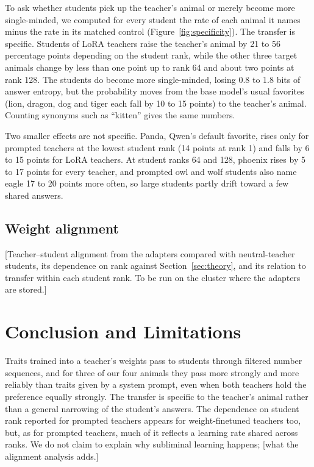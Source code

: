 \documentclass[11pt]{article}
\newcommand{\todo}[1]{\textcolor{red!70!black}{[#1]}}
\begin{document}
To ask whether students pick up the teacher's animal or merely become more single-minded, we computed for every student the rate of each animal it names minus the rate in its matched control (Figure~\ref{fig:specificity}). The transfer is specific. Students of LoRA teachers raise the teacher's animal by 21 to 56 percentage points depending on the student rank, while the other three target animals change by less than one point up to rank 64 and about two points at rank 128. The students do become more single-minded, losing 0.8 to 1.8 bits of answer entropy, but the probability moves from the base model's usual favorites (lion, dragon, dog and tiger each fall by 10 to 15 points) to the teacher's animal. Counting synonyms such as ``kitten'' gives the same numbers.

Two smaller effects are not specific. Panda, Qwen's default favorite, rises only for prompted teachers at the lowest student rank (14 points at rank 1) and falls by 6 to 15 points for LoRA teachers. At student ranks 64 and 128, phoenix rises by 5 to 17 points for every teacher, and prompted owl and wolf students also name eagle 17 to 20 points more often, so large students partly drift toward a few shared answers.

\subsection{Weight alignment}

\todo{Teacher--student alignment from the adapters compared with neutral-teacher students, its dependence on rank against Section~\ref{sec:theory}, and its relation to transfer within each student rank. To be run on the cluster where the adapters are stored.}

\section{Conclusion and Limitations}

Traits trained into a teacher's weights pass to students through filtered number sequences, and for three of our four animals they pass more strongly and more reliably than traits given by a system prompt, even when both teachers hold the preference equally strongly. The transfer is specific to the teacher's animal rather than a general narrowing of the student's answers. The dependence on student rank reported for prompted teachers appears for weight-finetuned teachers too, but, as for prompted teachers, much of it reflects a learning rate shared across ranks. We do not claim to explain why subliminal learning happens; \todo{what the alignment analysis adds.}
\end{document}
